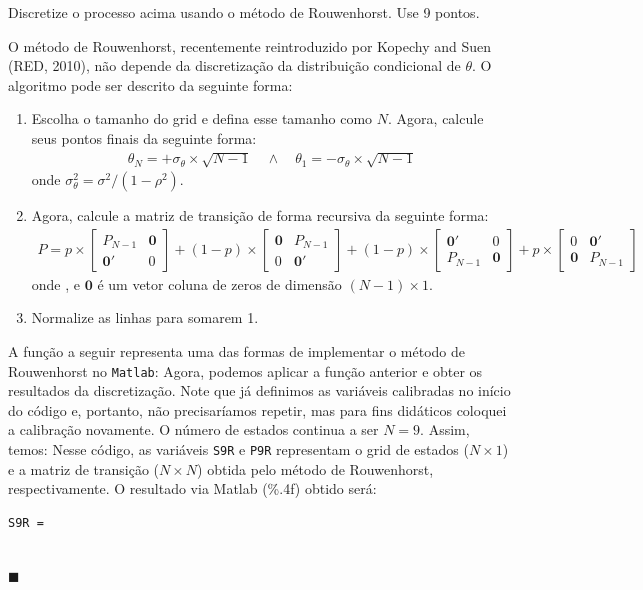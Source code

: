 \documentclass[10pt]{article}
\newcommand*{\QEDA}{\hfill\ensuremath{\blacksquare}}%
\newcommand\0{\mathbf{0}}
\newenvironment{sol}
    {\\[1em] {\color{magenta}\text{Resposta.}}
    }
    {{\color{blue!50!black}\QEDA}}
\begin{document}
Discretize o processo acima usando o método de Rouwenhorst. Use 9
pontos.
\begin{sol}
O método de Rouwenhorst, recentemente reintroduzido por Kopechy and Suen (RED, 2010), não depende da discretização da distribuição condicional de $\theta$. O algoritmo pode ser descrito da seguinte forma:  \vspace{-0.4cm}
\begin{enumerate}[wide]
\item Escolha o tamanho do grid e defina esse tamanho como $N$. Agora,  calcule seus pontos finais da seguinte forma: 
\begin{align*}
\theta_N = + \sigma_\theta\times  \sqrt{N-1} \quad \land \quad \theta_1 = - \sigma_\theta \times \sqrt{N-1}
\end{align*}
onde  $\sigma_\theta^2 = {\sigma^2}/{(1-\rho^2)}$.
\item Agora, calcule a matriz de transição de forma recursiva da seguinte forma: 
\begin{align*}
P = p \times \begin{bmatrix}
P_{N-1} & \0 \\
\0' & 0
\end{bmatrix} + (1-p) \times \begin{bmatrix}
\0 & P_{N-1}  \\
0 & \0'
\end{bmatrix} + (1-p) \times \begin{bmatrix}
\0' & 0 \\
P_{N-1} & \0
\end{bmatrix} + p \times \begin{bmatrix}
0 & \0' \\
\0 & P_{N-1} 
\end{bmatrix}
\end{align*}
onde ,  e $\0$ é um vetor coluna de zeros de dimensão $(N-1)\times 1$.
\item Normalize as linhas para somarem 1.
\end{enumerate}
\vspace{-0.3cm}
A função a seguir representa uma das formas de implementar o método de Rouwenhorst no \verb|Matlab|: \vspace{-0.4cm}
 \vspace{-0.3cm}
Agora, podemos aplicar a função anterior e obter os resultados da discretização. Note que já definimos as variáveis calibradas no início do código e, portanto, não precisaríamos repetir, mas para fins didáticos coloquei a calibração novamente. O número de estados continua a ser $N=9$. Assim, temos:
\vspace{-0.4cm}
 \vspace{-0.3cm}
Nesse código, as variáveis \verb|S9R| e \verb|P9R| representam o grid de estados ($N \times 1$) e a matriz de transição ($N\times N$) obtida pelo método de Rouwenhorst, respectivamente. O resultado via Matlab (\%.4f) obtido será:
\vspace{-0.4cm}
\begin{lstlisting}
S9R =


\end{lstlisting}
\end{sol}
\end{document}
